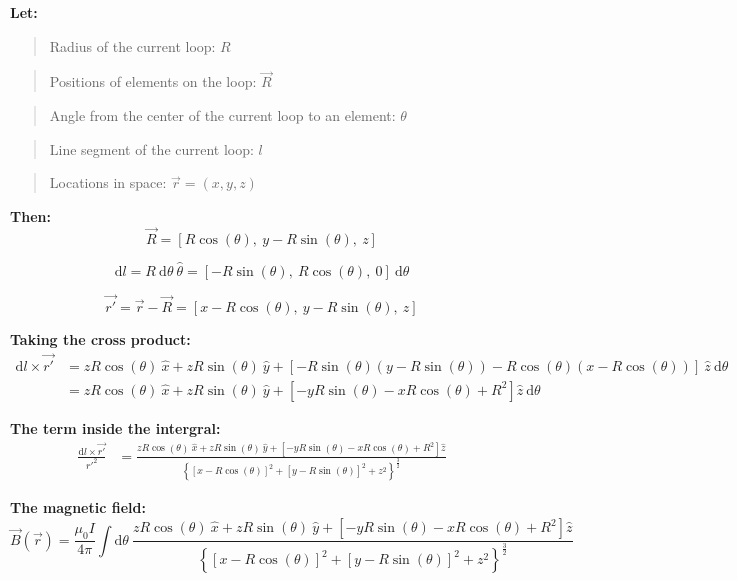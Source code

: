 \documentclass[11pt]{article}
\begin{document}
    \textbf{Let:}

\begin{quote}
Radius of the current loop: \(R\)
\end{quote}

\begin{quote}
Positions of elements on the loop: \(\vec{R}\)
\end{quote}

\begin{quote}
Angle from the center of the current loop to an element: \(\theta\)
\end{quote}

\begin{quote}
Line segment of the current loop: \(l\)
\end{quote}

\begin{quote}
Locations in space: \(\vec{r} = (x, y, z)\)
\end{quote}

    \textbf{Then:} \[\vec{R} = [R\cos(\theta),\ y-R\sin(\theta), \ z]\]

\[\text{d}l = R \ \text{d} \theta \ \hat{\theta} = [-R \sin(\theta), \ R \cos(\theta), \ 0] \ \text{d}\theta\]

\[\vec{r'} = \vec{r} - \vec{R} = [x-R\cos(\theta), \ y-R\sin(\theta), \ z]\]

\textbf{Taking the cross product:} \begin{align}
\text{d}l \times \vec{r'} &= zR\cos(\theta) \ \hat{x} + zR\sin(\theta) \ \hat{y} + [-R\sin(\theta)(y-R\sin(\theta)) - R\cos(\theta)(x-R\cos(\theta))] \ \hat{z} \ \text{d}\theta\\
&= zR\cos(\theta) \ \hat{x} + zR\sin(\theta) \ \hat{y} + [-yR\sin(\theta)-xR\cos(\theta) + R^2] \hat{z} \ \text{d}\theta 
\end{align}

\textbf{The term inside the intergral:} \begin{align}
\frac{\text{d}l \times \vec{r'}}{r'^2} &= \frac{zR\cos(\theta) \ \hat{x} + zR\sin(\theta) \ \hat{y} + [-yR\sin(\theta)-xR\cos(\theta) + R^2] \hat{z}}{\left\{[x-R\cos(\theta)]^2 + [y-R\sin(\theta)]^2 + z^2 \right\}^\frac{3}{2}}
\end{align}

\textbf{The magnetic field:}
\[\vec{B}(\vec{r}) = \frac{\mu_0 I}{4 \pi} \int \text{d}\theta \ \frac{zR\cos(\theta) \ \hat{x} + zR\sin(\theta) \ \hat{y} + [-yR\sin(\theta)-xR\cos(\theta) + R^2] \hat{z}}{\left\{[x-R\cos(\theta)]^2 + [y-R\sin(\theta)]^2 + z^2 \right\}^\frac{3}{2} }\]
\end{document}
